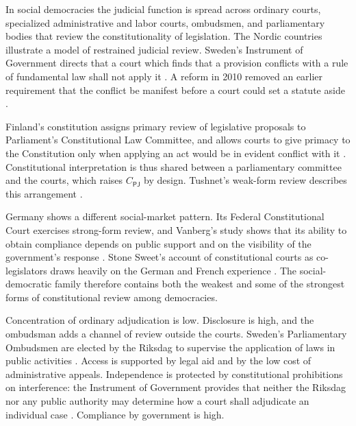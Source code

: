 \documentclass[11pt,letterpaper]{article}
\theoremstyle{definition}
\theoremstyle{remark}
\newcommand{\pP}{\mathsf{P}}
\newcommand{\pJ}{\mathsf{J}}
\begin{document}
In social democracies the judicial function is spread across ordinary courts, specialized administrative and labor courts, ombudsmen, and parliamentary bodies that review the constitutionality of legislation. The Nordic countries illustrate a model of restrained judicial review. Sweden's Instrument of Government directs that a court which finds that a provision conflicts with a rule of fundamental law shall not apply it \citep{swedenig}. A reform in 2010 removed an earlier requirement that the conflict be manifest before a court could set a statute aside \citep{jonssoncornell2016}.

Finland's constitution assigns primary review of legislative proposals to Parliament's Constitutional Law Committee, and allows courts to give primacy to the Constitution only when applying an act would be in evident conflict with it \citep{finlandconst}. Constitutional interpretation is thus shared between a parliamentary committee and the courts, which raises $C_{\pP\pJ}$ by design. Tushnet's weak-form review describes this arrangement \citep{tushnet2008}.

Germany shows a different social-market pattern. Its Federal Constitutional Court exercises strong-form review, and Vanberg's study shows that its ability to obtain compliance depends on public support and on the visibility of the government's response \citep{vanberg2005}. Stone Sweet's account of constitutional courts as co-legislators draws heavily on the German and French experience \citep{stonesweet2000}. The social-democratic family therefore contains both the weakest and some of the strongest forms of constitutional review among democracies.

Concentration of ordinary adjudication is low. Disclosure is high, and the ombudsman adds a channel of review outside the courts. Sweden's Parliamentary Ombudsmen are elected by the Riksdag to supervise the application of laws in public activities \citep{swedenig}. Access is supported by legal aid and by the low cost of administrative appeals. Independence is protected by constitutional prohibitions on interference: the Instrument of Government provides that neither the Riksdag nor any public authority may determine how a court shall adjudicate an individual case \citep{swedenig}. Compliance by government is high.
\end{document}
